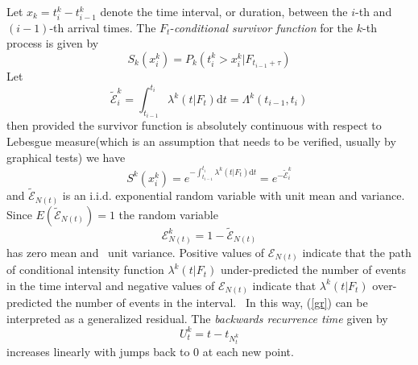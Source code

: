 \documentclass{article}
\newcommand{\mathd}{\mathrm{d}}
\newcommand{\tmem}[1]{{\em #1\/}}
\begin{document}
Let $x_k = t_i^k - t_{i - 1}^k$ denote the time interval, or duration, between
the $i$-th and $( i - 1)$-th arrival times. The $F_t$-{\tmem{conditional
survivor function}} for the $k$-th process is given by
\begin{equation}
  S_k ( x_i^k) = P_k ( t_i^k > x_i^k | F_{t_{i - 1} + \tau})
\end{equation}
Let
\[ \tilde{\mathcal{E}}_i^k = \int_{t_{i - 1}}^{t_i} \lambda^k ( t | F_t)
   \mathd t = \Lambda^k ( t_{i - 1}, t_i)_{} \label{gr} \]
then provided the survivor function is absolutely continuous with respect to
Lebesgue measure(which is an assumption that needs to be verified, usually by
graphical tests) we have
\begin{equation}
  S^k ( x_i^k) = e^{- \int_{t_{i - 1}}^{t_i} \lambda^k ( t | F_t) \mathd t} =
  e^{- \tilde{\mathcal{E}}_i^k} \label{S}
\end{equation}
and $\tilde{\mathcal{E}}_{N ( t)}$ is an i.i.d. exponential random variable
with unit mean and variance. Since $E ( \tilde{\mathcal{E}}_{N ( t)}) = 1$ the
random variable
\begin{equation}
  \mathcal{E}_{N ( t)}^k = 1 - \tilde{\mathcal{E}}_{N ( t)}
\end{equation}
has zero mean and \ unit variance. Positive values of $\mathcal{E}_{N ( t)}$
indicate that the path of conditional intensity function $\lambda^k ( t |
F_t)$ under-predicted the number of events in the time interval and negative
values of $\mathcal{E}_{N ( t)}$ indicate that $\lambda^k ( t | F_t)$
over-predicted the number of events in the interval. \ In this way, (\ref{gr})
can be interpreted as a generalized residual. The {\tmem{backwards recurrence
time}} given by
\begin{equation}
  U_t^k = t - t_{N_t^k}
\end{equation}
increases linearly with jumps back to 0 at each new point.
\end{document}
